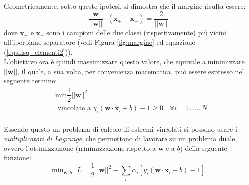 Geometricamente, sotto queste ipotesi, si dimostra che il margine risulta essere: 
\begin{equation}
\label{eq:margine}
\dfrac{\mathbf{w}}{\vert\vert\mathbf{w}\vert\vert}\cdot\left (\mathbf{x}_+-\mathbf{x}_-\right )=\dfrac{2}{\vert\vert\mathbf{w}\vert\vert}
\end{equation}
dove $\mathbf{x}_+$ e $\mathbf{x}_-$ sono i campioni delle due classi (rispettivamente) più vicini all'iperpiano separatore (vedi Figura \ref{fig:margine} ed equazione (\ref{eq:disq_elementi2})).
\\
L'obiettivo ora è quindi massimizzare questo valore, che equivale a minimizzare $\vert\vert\mathbf{w}\vert\vert$, il quale, a sua volta, per convenienza matematica, può essere espresso nel seguente termine:
\begin{eqnarray}\nonumber
\label{eq:problema_di_minimizzazione}
&\text{min}\dfrac{1}{2}\vert\vert\mathbf{w}\vert\vert^2\\
&\text{ vincolato a }y_i\left (\mathbf{w}\cdot\mathbf{x}_i+b\right )-1\geq0 \quad \forall i=1,\ldots,N
\end{eqnarray}
\\
Essendo questo un problema di calcolo di estremi vincolati si possono usare i \textit{moltiplicatori di Lagrange}, che permettono di lavorare su un problema duale, ovvero l'ottimizzazione (minimizzazione rispetto a $\mathbf{w}$ e a $b$) della seguente funzione:
\begin{equation}
\label{eq:lagrangiana}
\text{min}_{\mathbf{w},b}\text{ }L=\dfrac{1}{2}\vert\vert\mathbf{w}\vert\vert^2-\sum_i\alpha_i\left [y_i\left (\mathbf{w}\cdot\mathbf{x}_i+b\right )-1\right ]
\end{equation}
